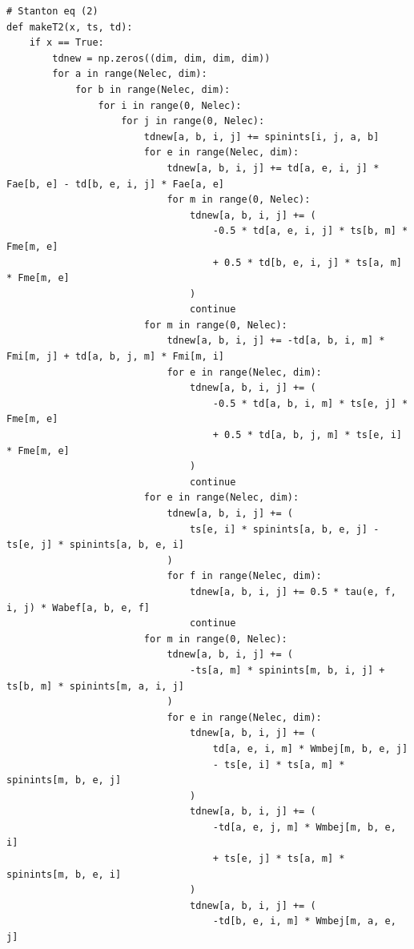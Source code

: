 \begin{lstlisting}[style=MyPython]
# Stanton eq (2)
def makeT2(x, ts, td):
    if x == True:
        tdnew = np.zeros((dim, dim, dim, dim))
        for a in range(Nelec, dim):
            for b in range(Nelec, dim):
                for i in range(0, Nelec):
                    for j in range(0, Nelec):
                        tdnew[a, b, i, j] += spinints[i, j, a, b]
                        for e in range(Nelec, dim):
                            tdnew[a, b, i, j] += td[a, e, i, j] * Fae[b, e] - td[b, e, i, j] * Fae[a, e]
                            for m in range(0, Nelec):
                                tdnew[a, b, i, j] += (
                                    -0.5 * td[a, e, i, j] * ts[b, m] * Fme[m, e]
                                    + 0.5 * td[b, e, i, j] * ts[a, m] * Fme[m, e]
                                )
                                continue
                        for m in range(0, Nelec):
                            tdnew[a, b, i, j] += -td[a, b, i, m] * Fmi[m, j] + td[a, b, j, m] * Fmi[m, i]
                            for e in range(Nelec, dim):
                                tdnew[a, b, i, j] += (
                                    -0.5 * td[a, b, i, m] * ts[e, j] * Fme[m, e]
                                    + 0.5 * td[a, b, j, m] * ts[e, i] * Fme[m, e]
                                )
                                continue
                        for e in range(Nelec, dim):
                            tdnew[a, b, i, j] += (
                                ts[e, i] * spinints[a, b, e, j] - ts[e, j] * spinints[a, b, e, i]
                            )
                            for f in range(Nelec, dim):
                                tdnew[a, b, i, j] += 0.5 * tau(e, f, i, j) * Wabef[a, b, e, f]
                                continue
                        for m in range(0, Nelec):
                            tdnew[a, b, i, j] += (
                                -ts[a, m] * spinints[m, b, i, j] + ts[b, m] * spinints[m, a, i, j]
                            )
                            for e in range(Nelec, dim):
                                tdnew[a, b, i, j] += (
                                    td[a, e, i, m] * Wmbej[m, b, e, j]
                                    - ts[e, i] * ts[a, m] * spinints[m, b, e, j]
                                )
                                tdnew[a, b, i, j] += (
                                    -td[a, e, j, m] * Wmbej[m, b, e, i]
                                    + ts[e, j] * ts[a, m] * spinints[m, b, e, i]
                                )
                                tdnew[a, b, i, j] += (
                                    -td[b, e, i, m] * Wmbej[m, a, e, j]

\end{lstlisting}
